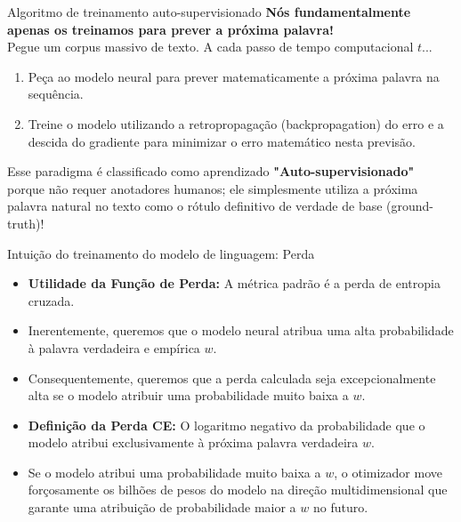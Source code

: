 \documentclass[aspectratio=169]{beamer}
\begin{document}
\begin{frame}{Algoritmo de treinamento auto-supervisionado}\justifying
    \textbf{Nós fundamentalmente apenas os treinamos para prever a próxima palavra!} \\
    Pegue um corpus massivo de texto. A cada passo de tempo computacional $t$...
    \begin{enumerate}
        \item Peça ao modelo neural para prever matematicamente a próxima palavra na sequência.
        \item Treine o modelo utilizando a retropropagação (backpropagation) do erro e a descida do gradiente para minimizar o erro matemático nesta previsão.
    \end{enumerate}
    \vspace{0.5cm}
    Esse paradigma é classificado como aprendizado \textbf{"Auto-supervisionado"} porque não requer anotadores humanos; ele simplesmente utiliza a próxima palavra natural no texto como o rótulo definitivo de verdade de base (ground-truth)!
\end{frame}

\begin{frame}{Intuição do treinamento do modelo de linguagem: Perda}\justifying
    \begin{itemize}
        \item \textbf{Utilidade da Função de Perda:} A métrica padrão é a perda de entropia cruzada.
        \item Inerentemente, queremos que o modelo neural atribua uma alta probabilidade à palavra verdadeira e empírica $w$.
        \item Consequentemente, queremos que a perda calculada seja excepcionalmente alta se o modelo atribuir uma probabilidade muito baixa a $w$.
        \item \textbf{Definição da Perda CE:} O logaritmo negativo da probabilidade que o modelo atribui exclusivamente à próxima palavra verdadeira $w$.
        \item Se o modelo atribui uma probabilidade muito baixa a $w$, o otimizador move forçosamente os bilhões de pesos do modelo na direção multidimensional que garante uma atribuição de probabilidade maior a $w$ no futuro.
    \end{itemize}
\end{frame}
\end{document}
